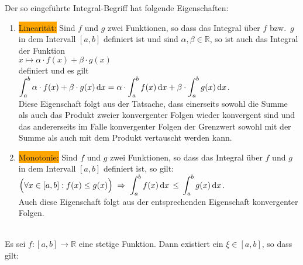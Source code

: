 \noindent
Der so eingef\"uhrte Integral-Begriff hat folgende Eigenschaften:
\begin{enumerate}
\item \colorbox{orange}{Linearit\"at:} Sind $f$ und $g$ zwei Funktionen, so dass
      das Integral \"uber $f$ bzw.~$g$ in dem Inter\-vall $[a,b]$ definiert ist
      und sind $\alpha,\beta \in\mathbb{R}$,
      so ist auch das Integral der Funktion
      \\[0.2cm]
      \hspace*{1.3cm} $x \mapsto \alpha\cdot f(x) + \beta\cdot g(x)$ \\[0.2cm]
      definiert und es gilt 
      \\[0.2cm]
      \hspace*{1.3cm}
      $\displaystyle\int_a^b \alpha\cdot f(x) + \beta\cdot g(x)\,\textrm{d} x = \alpha\cdot \int_a^b f(x)\,\textrm{d} x + \beta\cdot \int_a^b g(x)\,\textrm{d} x$.
      \\[0.2cm]
      Diese Eigenschaft folgt aus der Tatsache, dass einerseits sowohl die Summe als auch das
      Produkt zweier konvergenter Folgen wieder konvergent sind und das andererseits im Falle
      konvergenter Folgen der Grenzwert sowohl mit der Summe als auch mit dem Produkt vertauscht
      werden kann.
\item \colorbox{orange}{Monotonie:}  Sind $f$ und $g$ zwei Funktionen, so dass
      das Integral \"uber $f$ und  $g$ in dem Intervall $[a,b]$ definiert ist, so gilt: 
      \\[0.2cm]
      \hspace*{1.3cm}
      $\displaystyle\Bigl(\forall x \in [a,b]: f(x) \leq g(x)\Bigr) \;\Rightarrow\;
       \int_a^b f(x)\, \textrm{d} x \,\leq\, \int_a^b g(x)\, \textrm{d} x$.
      \\[0.2cm] 
      Auch diese Eigenschaft folgt aus der entsprechenden Eigenschaft konvergenter Folgen.
\end{enumerate}


\begin{Satz} \hspace*{\fill} \\
Es sei $f:[a,b] \rightarrow \mathbb{R}$ eine stetige Funktion. Dann existiert ein $\xi \in [a,b]$, so dass gilt:
\\[0.2cm]
\hspace*{1.3cm}
\colorbox{red}{\colorbox{orange}{}}
\end{Satz}

